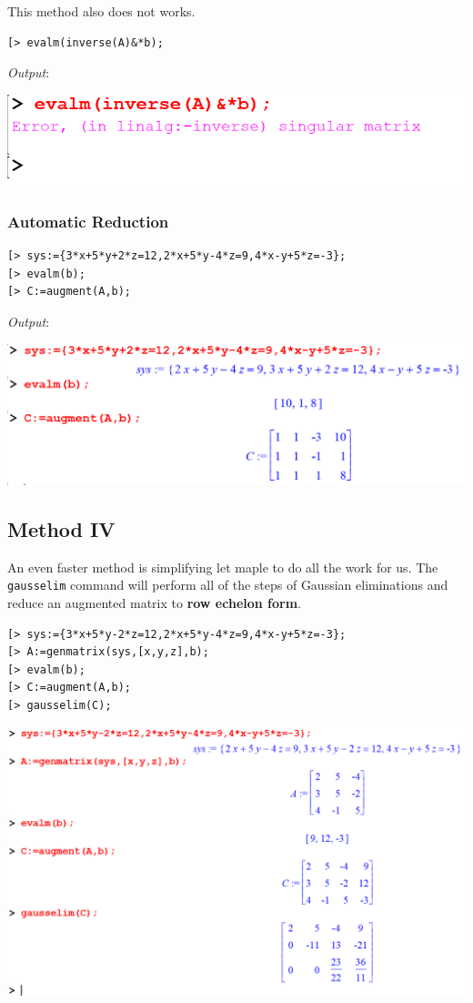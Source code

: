\documentclass[
]{book}
\theoremstyle{definition}
\theoremstyle{definition}
\theoremstyle{definition}
\theoremstyle{definition}
\theoremstyle{remark}
\begin{document}
This method also does not works.

\begin{verbatim}
[> evalm(inverse(A)&*b);
\end{verbatim}

\emph{Output}:

\includegraphics{figures/Lesson 5/fig13.png}

\subsubsection{Automatic Reduction}\label{automatic-reduction}

\begin{verbatim}
[> sys:={3*x+5*y+2*z=12,2*x+5*y-4*z=9,4*x-y+5*z=-3};
[> evalm(b);
[> C:=augment(A,b);
\end{verbatim}

\emph{Output}:

\includegraphics{figures/Lesson 5/fig14.png}

\subsection{Method IV}\label{method-iv}

An even faster method is simplifying let maple to do all the work for us. The \texttt{gausselim} command will perform all of the steps of Gaussian eliminations and reduce an augmented matrix to \textbf{row echelon form}.

\begin{verbatim}
[> sys:={3*x+5*y-2*z=12,2*x+5*y-4*z=9,4*x-y+5*z=-3};
[> A:=genmatrix(sys,[x,y,z],b);
[> evalm(b);
[> C:=augment(A,b);
[> gausselim(C);
\end{verbatim}

\includegraphics{figures/Lesson 5/fig15.png}
\end{document}
